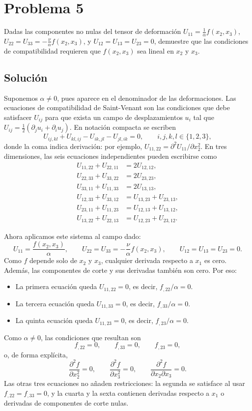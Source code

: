 \documentclass[a4paper]{article}
\begin{document}
\section{Problema 5}

Dadas las componentes no nulas del tensor de deformación $U_{11} = \frac{1}{\alpha} f(x_2, x_3)$, $U_{22} = U_{33} = -\frac{\nu}{\alpha} f(x_2, x_3)$, y $U_{12} = U_{13} = U_{23} = 0$, demuestre que las condiciones de compatibilidad requieren que $f(x_2, x_3)$ sea lineal en $x_2$ y $x_3$.

\subsection{Solución}
Suponemos $\alpha\ne 0$, pues aparece en el denominador de las deformaciones. Las ecuaciones de compatibilidad de Saint-Venant son las condiciones que debe satisfacer $U_{ij}$ para que exista un campo de desplazamientos $u_i$ tal que $U_{ij}=\tfrac12(\partial_j u_i+\partial_i u_j)$. En notación compacta se escriben
$$
U_{ij,kl}+U_{kl,ij}-U_{ik,jl}-U_{jl,ik}=0,
\qquad i,j,k,l\in\{1,2,3\},
$$
donde la coma indica derivación: por ejemplo, $U_{11,22}=\partial^2 U_{11}/\partial x_2^2$. En tres dimensiones, las seis ecuaciones independientes pueden escribirse como
$$
\begin{aligned}
U_{11,22}+U_{22,11}&=2U_{12,12},\\
U_{22,33}+U_{33,22}&=2U_{23,23},\\
U_{33,11}+U_{11,33}&=2U_{13,13},\\
U_{12,33}+U_{33,12}&=U_{13,23}+U_{23,13},\\
U_{23,11}+U_{11,23}&=U_{12,13}+U_{13,12},\\
U_{13,22}+U_{22,13}&=U_{12,23}+U_{23,12}.
\end{aligned}
$$

Ahora aplicamos este sistema al campo dado:
$$
U_{11}=\frac{f(x_2,x_3)}{\alpha},\qquad
U_{22}=U_{33}=-\frac{\nu}{\alpha}f(x_2,x_3),\qquad
U_{12}=U_{13}=U_{23}=0.
$$
Como $f$ depende solo de $x_2$ y $x_3$, cualquier derivada respecto a $x_1$ es cero. Además, las componentes de corte y sus derivadas también son cero. Por eso:
\begin{itemize}
    \item La primera ecuación queda $U_{11,22}=0$, es decir, $f_{,22}/\alpha=0$.
    \item La tercera ecuación queda $U_{11,33}=0$, es decir, $f_{,33}/\alpha=0$.
    \item La quinta ecuación queda $U_{11,23}=0$, es decir, $f_{,23}/\alpha=0$.
\end{itemize}
Como $\alpha\ne0$, las condiciones que resultan son
$$
f_{,22}=0,\qquad f_{,33}=0,\qquad f_{,23}=0,
$$
o, de forma explícita,
$$
\frac{\partial^2 f}{\partial x_2^2}=0,\qquad
\frac{\partial^2 f}{\partial x_3^2}=0,\qquad
\frac{\partial^2 f}{\partial x_2\partial x_3}=0.
$$
Las otras tres ecuaciones no añaden restricciones: la segunda se satisface al usar $f_{,22}=f_{,33}=0$, y la cuarta y la sexta contienen derivadas respecto a $x_1$ o derivadas de componentes de corte nulas.
\end{document}
